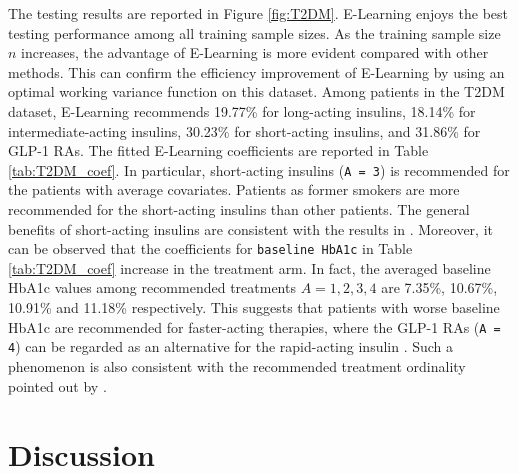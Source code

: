 \documentclass[11pt]{article}
\theoremstyle{definition}
\theoremstyle{remark}
\begin{document}
The testing results are reported in Figure \ref{fig:T2DM}. E-Learning enjoys the best testing performance among all training sample sizes. As the training sample size $ n $ increases, the advantage of E-Learning is more evident compared with other methods. This can confirm the efficiency improvement of E-Learning by using an optimal working variance function on this dataset. Among patients in the T2DM dataset, E-Learning recommends 19.77\% for long-acting insulins, 18.14\% for intermediate-acting insulins, 30.23\% for short-acting insulins, and 31.86\% for GLP-1 RAs. The fitted E-Learning coefficients are reported in Table \ref{tab:T2DM_coef}. In particular, short-acting insulins (\texttt{A = 3}) is recommended for the patients with average covariates. Patients as former smokers are more recommended for the short-acting insulins than other patients. The general benefits of short-acting insulins are consistent with the results in \citet{chen2018estimating,meng2020near}. Moreover, it can be observed that the coefficients for \texttt{baseline HbA1c} in Table \ref{tab:T2DM_coef} increase in the treatment arm. In fact, the averaged baseline HbA1c values among recommended treatments $ A = 1,2,3,4 $ are 7.35\%, 10.67\%, 10.91\% and 11.18\% respectively.
This suggests that patients with worse baseline HbA1c are recommended for faster-acting therapies, where the GLP-1 RAs (\texttt{A = 4}) can be regarded as an alternative for the rapid-acting insulin \citep{ostroff2016glp}. Such a phenomenon is also consistent with the recommended treatment ordinality pointed out by \citet{chen2018estimating}.

\renewcommand{\arraystretch}{1}
\begin{table}
	\centering
	\fontsize{8}{10}\selectfont
	\caption{E-Learning Coefficients on the T2DM Dataset}\label{tab:T2DM_coef}
	
\end{table}

\section{Discussion}\label{sec:discuss}
\end{document}
